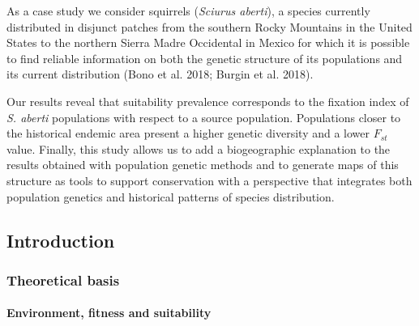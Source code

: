 \documentclass[
]{article}
\begin{document}
As a case study we consider squirrels (\emph{Sciurus aberti}), a species
currently distributed in disjunct patches from the southern Rocky
Mountains in the United States to the northern Sierra Madre Occidental
in Mexico for which it is possible to find reliable information on both
the genetic structure of its populations and its current distribution
(Bono et al. 2018; Burgin et al. 2018).

Our results reveal that suitability prevalence corresponds to the
fixation index of \emph{S. aberti} populations with respect to a source
population. Populations closer to the historical endemic area present a
higher genetic diversity and a lower \(F_{st}\) value. Finally, this
study allows us to add a biogeographic explanation to the results
obtained with population genetic methods and to generate maps of this
structure as tools to support conservation with a perspective that
integrates both population genetics and historical patterns of species
distribution.

\hypertarget{introduction}{%
\subsection{Introduction}\label{introduction}}

\hypertarget{theoretical-basis}{%
\subsubsection{Theoretical basis}\label{theoretical-basis}}

\hypertarget{environment-fitness-and-suitability}{%
\paragraph{Environment, fitness and
suitability}\label{environment-fitness-and-suitability}}
\end{document}
